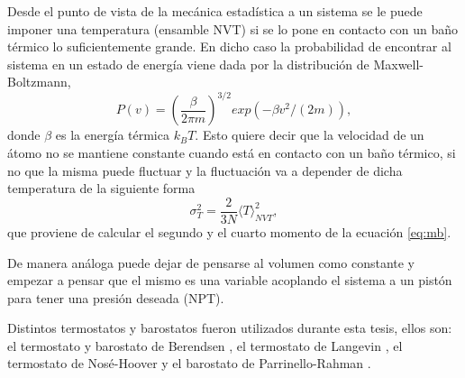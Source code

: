 Desde el punto de vista de la mecánica estadística a un sistema se le puede 
imponer una temperatura (ensamble NVT) si se lo pone en contacto con un baño 
térmico lo suficientemente grande. En dicho caso la probabilidad de encontrar al 
sistema en un estado de energía viene dada por la distribución de 
Maxwell-Boltzmann,
\begin{equation}\label{eq:mb}
    P(v) = \left( \frac{\beta}{2\pi m} \right)^{3/2} exp(-\beta v^2 / (2m)),
\end{equation}
donde $\beta$ es la energía térmica $k_B T$. Esto quiere decir que la velocidad 
de un átomo no se mantiene constante cuando está en contacto con un baño térmico, 
si no que la misma puede fluctuar y la fluctuación va a depender de dicha 
temperatura de la siguiente forma
\begin{equation}
    \sigma_T^2 = \frac{2}{3 N} \langle T \rangle_{NVT}^2,
\end{equation}
que proviene de calcular el segundo y el cuarto momento de la ecuación 
\ref{eq:mb}.

De manera análoga puede dejar de pensarse al volumen como constante y empezar a
pensar que el mismo es una variable acoplando el sistema a un pistón para tener
una presión deseada (NPT).

Distintos termostatos y barostatos fueron utilizados durante esta tesis, ellos 
son: el termostato y barostato de Berendsen \cite{berendsen1984}, el termostato 
de Langevin \cite{schneider1978, kroger2005}, el termostato de Nosé-Hoover 
\cite{nose1984a, nose1984b, hoover1985} y el barostato de Parrinello-Rahman
\cite{parrinello-rahman}.
